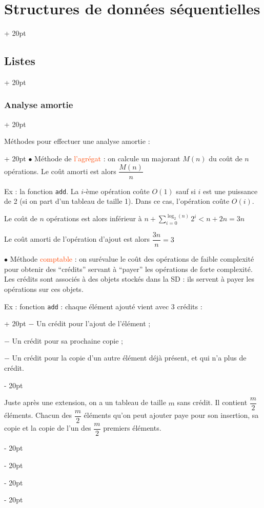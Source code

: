 \documentclass[a4paper, 12pt, twoside]{article}
\renewcommand{\emph}{\textcolor{ff4500}}
\newcommand{\ind}[1][20pt]{\advance\leftskip + #1}
\newcommand{\deind}[1][20pt]{\advance\leftskip - #1}
\newenvironment{indt}[2][20pt]{#2 \par \ind[#1]}{\par \deind} %
\begin{document}
\begin{indt}{\section{Structures de données séquentielles}}
\begin{indt}{\subsection{Listes}}
\begin{indt}{\subsubsection{Analyse amortie}}
                \vspace{12pt}
                
                \begin{indt}{Méthodes pour effectuer une analyse amortie :}
                    $\bullet$ Méthode de \emph{l'agrégat} : on calcule un majorant $M(n)$ du coût de $n$ opérations. Le coût amorti est alors $\dfrac{M(n)}{n}$
                    
                    Ex : la fonction \texttt{add}. La $i$-ème opération coûte $O(1)$ sauf si $i$ est une puissance de 2 (si on part d'un tableau de taille 1). Dans ce cas, l'opération coûte $O(i)$.
                    
                    Le coût de $n$ opérations est alors inférieur à $\displaystyle n + \sum_{i = 0}^{\log_2(n)} 2^i < n + 2n = 3n$
                    
                    Le coût amorti de l'opération d'ajout est alors $\dfrac{3n}{n} = 3$
                    
                    \vspace{12pt}
                    
                    $\bullet$ Méthode \emph{comptable} : on surévalue le coût des opérations de faible complexité pour obtenir des ``crédits'' servant à ``payer'' les opérations de forte complexité. Les crédits sont associés à des objets stockés dans la SD : ils servent à payer les opérations sur ces objets.
                    
                    \begin{indt}{Ex : fonction \texttt{add} : chaque élément ajouté vient avec 3 crédits :}
                        $-$ Un crédit pour l'ajout de l'élément ;
                        
                        $-$ Un crédit pour sa prochaine copie ;
                        
                        $-$ Un crédit pour la copie d'un autre élément déjà présent, et qui n'a plus de crédit.
                    \end{indt}
                    
                    \vspace{6pt}
                    
                    Juste après une extension, on a un tableau de taille $m$ sans crédit. Il contient $\dfrac m 2$ éléments.
                    Chacun des $\dfrac m 2$ éléments qu'on peut ajouter paye pour son insertion, sa copie et la copie de l'un des $\dfrac m 2$ premiers éléments.
                    

\end{indt}
\end{indt}
\end{indt}
\end{indt}
\end{document}
